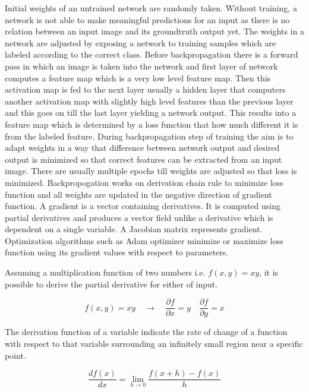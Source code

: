 \documentclass[11pt]{article}
\begin{document}
Initial weights of an untrained network are randomly taken. Without training, a network is not able to make meaningful predictions for an input as there is no relation between an input image and its groundtruth output yet. The weights in a network are adjusted by exposing a network to training samples which are labeled according to the correct class. Before backpropagation there is a forward pass in which an image is taken into the network and first layer of network computes a feature map which is a very low level feature map. Then this activation map is fed to the next layer usually a hidden layer that computers another activation map with slightly high level features than the previous layer and this goes on till the last layer yielding a network output. This results into a feature map which is determined by a loss function that how much different it is from the labeled feature. During backpropagation step of training the aim is to adapt weights in a way that difference between network output and desired output is minimized so that correct features can be extracted from an input image. There are usually multiple epochs till weights are adjusted so that loss is minimized. Backpropogation works on derivation chain rule to minimize loss function and all weights are updated in the negative direction of gradient function. A gradient is a vector containing derivatives. It is computed using partial derivatives and produces a vector field unlike a derivative which is dependent on a single variable. A Jacobian matrix represents gradient. Optimization algorithms such as Adam optimizer minimize or maximize loss function using its gradient values with respect to parameters.

Assuming a multiplication function of two numbers i.e. $f(x, y)=x y$, it is possible to derive the partial derivative for either of input.

\begin{equation}
f(x, y)=x y \quad \rightarrow \quad \frac{\partial f}{\partial x}=y \quad \frac{\partial f}{\partial y}=x
\end{equation}

The derivation function of a variable indicate the rate of change of a function with respect to that variable surrounding an infinitely small region near a specific point.

\begin{equation}
\frac{d f(x)}{d x}=\lim _{h \rightarrow 0} \frac{f(x+h)-f(x)}{h}
\end{equation}
\end{document}

